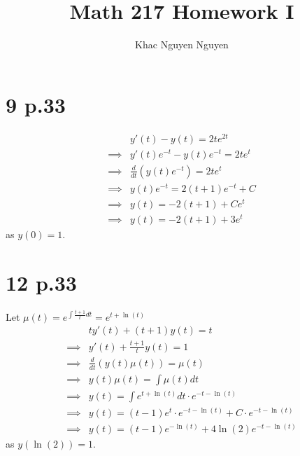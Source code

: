\documentclass[11pt]{article}
\title{\textbf{Math 217 Homework I}}
\author{Khac Nguyen Nguyen}
\date{}
\begin{document}
\section*{9 p.33}
\begin{equation*}
    \begin{aligned}
        &y'(t)-y(t) = 2te^{2t} \\
        \implies &y'(t)e^{-t} -y(t)e^{-t} = 2te^t \\
        \implies &\frac{d}{dt} (y(t)e^{-t}) = 2te^t  \\
        \implies & y(t)e^{-t} = 2(t+1)e^{-t} + C \\
        \implies &y(t) = -2(t+1) + Ce^{t} \\
        \implies &y(t) = -2(t+1) + 3e^{t}
    \end{aligned}
\end{equation*}
as $y(0)=1$.
\newpage
\section*{12 p.33}
Let $\mu(t) = e^{\int \frac{t+1}{t}dt} =e^{t+\ln(t)}$
\begin{equation*}
    \begin{aligned}
        &ty'(t) + (t+1)y(t) = t \\
        \implies &y'(t) + \frac{t+1}{t}y(t) = 1 \\
        \implies &\frac{d}{dt}(y(t)\mu(t)) = \mu(t) \\
        \implies &y(t)\mu(t) = \int \mu(t) dt \\
        \implies &y(t) = \int e^{t+\ln(t)} dt \cdot e^{-t-\ln(t)} \\
        \implies &y(t) = (t-1)e^t \cdot e^{-t-\ln(t)} + C \cdot e^{-t-\ln(t)} \\
        \implies &y(t) = (t-1)e^{-\ln(t)} + 4\ln(2) e^{-t-\ln(t)}
    \end{aligned}
\end{equation*}
as $y(\ln(2))=1$.
\newpage
\end{document}
